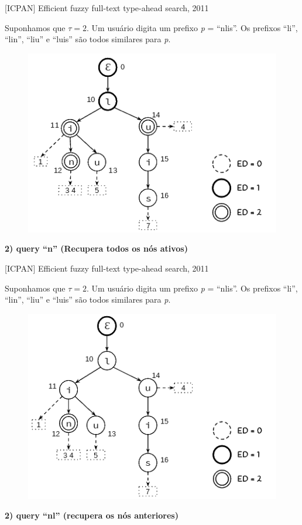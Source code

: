 \documentclass[11pt]{beamer}
\begin{document}
\begin{frame}{[ICPAN] Efficient fuzzy full-text type-ahead search, 2011}
    
    \small
    Suponhamos que $\tau = 2$. Um usuário digita um prefixo \textit{p} = ``nlis''. Os prefixos ``li'', ``lin'', ``liu'' e ``luis'' são todos similares para \textit{p}.

    \begin{figure}
      \includegraphics[scale=0.50]{pictures/ipcan_full_1.png}
      \centering
    \end{figure}
    
    \textbf{2) query ``n'' (Recupera todos os nós ativos)}
    
\end{frame}

\begin{frame}{[ICPAN] Efficient fuzzy full-text type-ahead search, 2011}
    
    \small
    Suponhamos que $\tau = 2$. Um usuário digita um prefixo \textit{p} = ``nlis''. Os prefixos ``li'', ``lin'', ``liu'' e ``luis'' são todos similares para \textit{p}.

    \begin{figure}
      \includegraphics[scale=0.50]{pictures/ipcan_2.png}
      \centering
    \end{figure}
    
    \textbf{2) query ``nl'' (recupera os nós anteriores)}
    
\end{frame}
\end{document}
